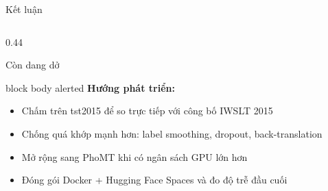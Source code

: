 \documentclass[aspectratio=169, 10pt]{beamer}
\begin{document}
\begin{frame}[shrink=15]{Kết luận}
\begin{columns}[T]
\begin{column}{0.44\textwidth}
\begin{block}{Còn dang dở}
      \end{block}
      \begin{beamercolorbox}[wd=\textwidth, rounded=true, sep=7pt]{block body alerted}
        \textbf{\textcolor{MLIOTblue}{Hướng phát triển:}}
        {\color{MLIOTink}\footnotesize
        \begin{itemize}
          \setlength{\itemsep}{0.1em}
          \item Chấm trên tst2015 để so trực tiếp với công bố IWSLT 2015
          \item Chống quá khớp mạnh hơn: label smoothing, dropout, back-translation
          \item Mở rộng sang PhoMT khi có ngân sách GPU lớn hơn
          \item Đóng gói Docker + Hugging Face Spaces và đo độ trễ đầu cuối
        \end{itemize}}
      \end{beamercolorbox}
    \end{column}
  \end{columns}
\end{frame}
\end{document}
